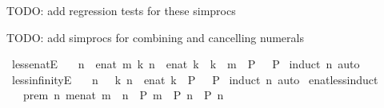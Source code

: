 \begin{isabellebody}
\endisatagML
{\isafoldML}%
%
\isadelimML
%
\endisadelimML
%
\begin{isamarkuptext}%
TODO: add regression tests for these simprocs%
\end{isamarkuptext}\isamarkuptrue%
%
\begin{isamarkuptext}%
TODO: add simprocs for combining and cancelling numerals%
\end{isamarkuptext}\isamarkuptrue%
%
\isadelimdocument
%
\endisadelimdocument
%
\isatagdocument
%
\isamarkuptrue%
%
\endisatagdocument
{\isafolddocument}%
%
\isadelimdocument
%
\endisadelimdocument
{}\isamarkupfalse%
\ less{\isacharunderscore}enatE{\isacharcolon}\isanewline
\ \ {\isachardoublequoteopen}{\isacharbrackleft}{\isacharbar}\ n\ {\isacharless}\ enat\ m{\isacharsemicolon}\ {\isacharbang}{\isacharbang}k{\isachardot}\ n\ {\isacharequal}\ enat\ k\ {\isacharequal}{\isacharequal}{\isachargreater}\ k\ {\isacharless}\ m\ {\isacharequal}{\isacharequal}{\isachargreater}\ P\ {\isacharbar}{\isacharbrackright}\ {\isacharequal}{\isacharequal}{\isachargreater}\ P{\isachardoublequoteclose}\isanewline
%
\isadelimproof
%
\endisadelimproof
%
\isatagproof
{}\isamarkupfalse%
\ {\isacharparenleft}induct\ n{\isacharparenright}\ auto%
\endisatagproof
{\isafoldproof}%
%
\isadelimproof
\isanewline
%
\endisadelimproof
\isanewline
{}\isamarkupfalse%
\ less{\isacharunderscore}infinityE{\isacharcolon}\isanewline
\ \ {\isachardoublequoteopen}{\isacharbrackleft}{\isacharbar}\ n\ {\isacharless}\ {\isasyminfinity}{\isacharsemicolon}\ {\isacharbang}{\isacharbang}k{\isachardot}\ n\ {\isacharequal}\ enat\ k\ {\isacharequal}{\isacharequal}{\isachargreater}\ P\ {\isacharbar}{\isacharbrackright}\ {\isacharequal}{\isacharequal}{\isachargreater}\ P{\isachardoublequoteclose}\isanewline
%
\isadelimproof
%
\endisadelimproof
%
\isatagproof
{}\isamarkupfalse%
\ {\isacharparenleft}induct\ n{\isacharparenright}\ auto%
\endisatagproof
{\isafoldproof}%
%
\isadelimproof
\isanewline
%
\endisadelimproof
\isanewline
{}\isamarkupfalse%
\ enat{\isacharunderscore}less{\isacharunderscore}induct{\isacharcolon}\isanewline
\ \ \ prem{\isacharcolon}\ {\isachardoublequoteopen}{\isasymAnd}n{\isachardot}\ {\isasymforall}m{\isacharcolon}{\isacharcolon}enat{\isachardot}\ m\ {\isacharless}\ n\ {\isasymlongrightarrow}\ P\ m\ {\isasymLongrightarrow}\ P\ n{\isachardoublequoteclose}\ \ {\isachardoublequoteopen}P\ n{\isachardoublequoteclose}\isanewline
%
\isadelimproof

\end{isabellebody}
